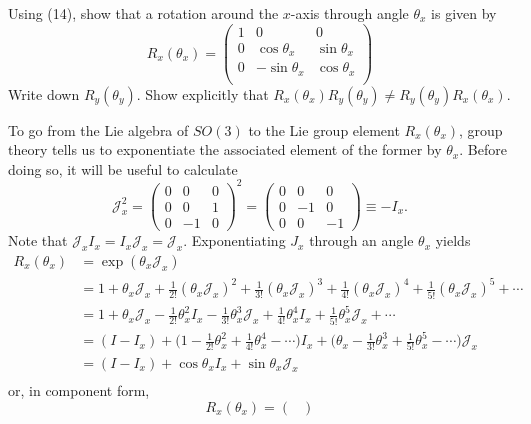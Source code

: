 \documentclass[../group-theory-in-a-nutshell-for-physicists.tex]{subfiles}
\begin{document}
\begin{questions}
\question Using (14), show that a rotation around the $x$-axis through angle
$\theta_{x}$ is given by
\[
R_{x}(\theta_{x}) = \begin{pmatrix}
1 & 0 & 0 \\
0 & \cos\theta_{x} & \sin\theta_{x} \\
0 & - \sin\theta_{x} & \cos\theta_{x} \\
\end{pmatrix}
\]
Write down $R_{y}(\theta_{y})$. Show explicitly that
$R_{x}(\theta_{x})R_{y}(\theta_{y}) \neq R_{y}(\theta_{y})R_{x}(\theta_{x})$.

\begin{solution}
	To go from the Lie algebra of $SO(3)$ to the Lie group element $R_x(\theta_x)$, group theory tells us to exponentiate the associated element of the former by $\theta_x$. Before doing so, it will be useful to calculate
	\[
		\mathcal{J}_x^2 = \begin{pmatrix}0 & 0 & 0 \\ 0 & 0 & 1 \\ 0 & -1 & 0\end{pmatrix}^2 =  \begin{pmatrix}0 & 0 & 0 \\ 0 & -1 & 0 \\ 0 & 0 & -1\end{pmatrix} \equiv -I_x.
	\]
	Note that $\mathcal{J}_xI_x = I_x\mathcal{J}_x = \mathcal{J}_x$. Exponentiating $J_x$ through an angle $\theta_x$ yields
	\begin{align*}
		R_x(\theta_x) &= \exp(\theta_x\mathcal{J}_x) \\
		&= 1 + \theta_x\mathcal{J}_x + \frac{1}{2!}(\theta_x\mathcal{J}_x)^2 + \frac{1}{3!}(\theta_x\mathcal{J}_x)^3 + \frac{1}{4!}(\theta_x\mathcal{J}_x)^4 + \frac{1}{5!}(\theta_x\mathcal{J}_x)^5 + \cdots \\
		&= 1 + \theta_x\mathcal{J}_x - \frac{1}{2!}\theta_x^2I_x - \frac{1}{3!}\theta_x^3\mathcal{J}_x + \frac{1}{4!}\theta_x^4I_x + \frac{1}{5!}\theta_x^5\mathcal{J}_x + \cdots \\
		&= (I - I_x) + \Big(1 - \frac{1}{2!}\theta_x^2 + \frac{1}{4!}\theta_x^4 - \cdots\Big)I_x + \Big(\theta_x - \frac{1}{3!}\theta_x^3 + \frac{1}{5!}\theta_x^5 - \cdots\Big)\mathcal{J}_x \\
		&= (I - I_x) + \cos\theta_xI_x + \sin\theta_x\mathcal{J}_x \\
	\end{align*}
	or, in component form, 
	\[
		R_x(\theta_x) = \begin{pmatrix}

\end{pmatrix}\]
\end{solution}
\end{questions}
\end{document}

